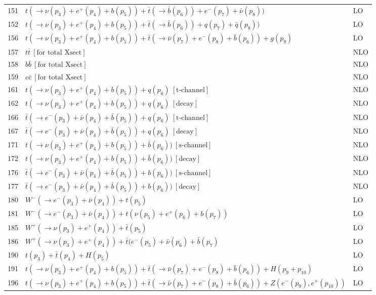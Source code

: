 \documentclass[12pt]{article}
\begin{document}
\begin{itemize}
\begin{table}
\begin{center}
\begin{tabular}{|l|l|l|}
151& $ t(\to \nu(p_3)+e^+(p_4)+b(p_5))+\bar{t}(\to \bar{b}(p_6))+e^-(p_7)+\bar{\nu}(p_8)) $ & LO \\
152& $ t(\to \nu(p_3)+e^+(p_4)+b(p_5))+\bar{t}(\to \bar{b}(p_6))+q(p_7)+\bar{q}(p_8)) $ & LO \\
\hline 
156& $t(\to \nu(p_3)+e^+(p_4)+b(p_5))+\bar{t}(\to \bar{\nu}(p_7)+e^-(p_8)+\bar{b}(p_6))+g(p_9) $ & LO \\
\hline 
157& $ t \bar{t} ~[ \mbox{for total Xsect} ] $ & NLO \\
158& $ b \bar{b} ~[ \mbox{for total Xsect} ] $ & NLO \\
159& $ c \bar{c} ~[ \mbox{for total Xsect} ] $ & NLO \\
\hline 
161& $ t(\to \nu(p_3)+e^+(p_4)+b(p_5))+q(p_6) ~[ \mbox{t-channel} ] $ & NLO \\
162& $ t(\to \nu(p_3)+e^+(p_4)+b(p_5))+q(p_6) ~[ \mbox{decay} ] $ & NLO \\
166& $ \bar{t}(\to e^-(p_3)+\bar{\nu}(p_4)+\bar{b}(p_5))+q(p_6) ~[ \mbox{t-channel} ] $ & NLO \\
167& $ \bar{t}(\to e^-(p_3)+\bar{\nu}(p_4)+\bar{b}(p_5))+q(p_6) ~[ \mbox{decay} ] $ & NLO \\
\hline 
171& $ t(\to \nu(p_3)+e^+(p_4)+b(p_5))+\bar{b}(p_6)) ~[ \mbox{s-channel} ] $ & NLO \\
172& $ t(\to \nu(p_3)+e^+(p_4)+b(p_5))+\bar{b}(p_6)) ~[ \mbox{decay} ] $ & NLO \\
176& $ \bar{t}(\to e^-(p_3)+\bar{\nu}(p_4)+\bar{b}(p_5))+b(p_6)) ~[ \mbox{s-channel} ] $ & NLO \\
177& $ \bar{t}(\to e^-(p_3)+\bar{\nu}(p_4)+\bar{b}(p_5))+b(p_6)) ~[ \mbox{decay} ] $ & NLO \\
\hline 
180& $ W^-(\to e^-(p_3)+\bar{\nu}(p_4))+t(p_5) $ & LO \\
181& $ W^-(\to e^-(p_3)+\bar{\nu}(p_4))+t(\nu(p_5)+e^+(p_6)+b(p_7)) $ & LO \\
185& $ W^+(\to \nu(p_3)+e^+(p_4))+\bar{t}(p_5) $ & LO \\
186& $ W^+(\to \nu(p_3)+e^+(p_4))+\bar{t}(e^-(p_5)+\bar{\nu}(p_6)+\bar{b}(p_7) $ & LO \\
\hline 
190& $t(p_3)+\bar{t}(p_4)+H(p_5) $ & LO \\
191& $ t(\to \nu(p_3)+e^+(p_4)+b(p_5))+\bar{t}(\to \bar{\nu}(p_7)+e^-(p_8)+\bar{b}(p_6))+H(p_9+p_{10}) $ & LO \\
\hline 
196& $ t(\to \nu(p_3)+e^+(p_4)+b(p_5))+\bar{t}(\to \bar{\nu}(p_7)+e^-(p_8)+\bar{b}(p_6))+Z(e^-(p_9),e^+(p_{10})) $ & LO \\

\end{tabular}
\end{center}
\end{table}
\end{itemize}
\end{document}
